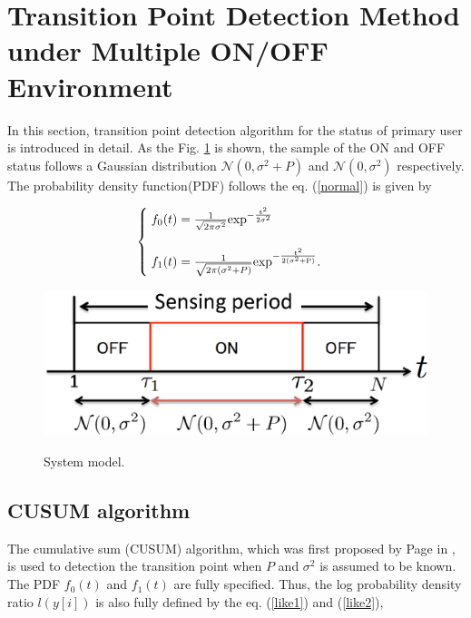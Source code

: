 \section{Transition Point Detection Method under Multiple ON/OFF Environment }    

In this section, transition point detection algorithm for the status of primary user is introduced in detail. As the Fig. \ref{system_model} is shown, the sample of the ON and OFF status follows a Gaussian distribution $\mathcal{N}(0,\sigma^2+P)$ and $\mathcal{N}(0,\sigma^2)$ respectively. The probability density function(PDF) follows the eq. (\ref{normal}) is given by

\begin{eqnarray}
\begin{cases}
\;f_0(t) = \frac{1}{\sqrt{2\pi\sigma^2}} \rm{exp}^{-\frac{t^2}{2\sigma^2}} \\
\; \\ \nonumber
\;f_1(t) = \frac{1}{\sqrt{2\pi(\sigma^2+P)}} \rm{exp}^{-\frac{t^2}{2(\sigma^2+P)}}.
\end{cases}
\label{normal}
\end{eqnarray}

\begin{center}
  \begin{figure}[t]
    \centering
    \includegraphics[width=120mm]{systemodel.eps}
    \label{system_model}
    \caption{\normalsize{System model.}}
  \end{figure}
\end{center} 

\subsection{CUSUM algorithm}
The cumulative sum (CUSUM) algorithm, which was first proposed by Page in \cite{ref:CUSUM}, is used to detection the transition point when $P$ and $\sigma^2$ is assumed to be known.
The PDF $f_0(t)$ and $f_1(t)$ are fully specified. Thus, the log probability density ratio $l(y[i])$ is also fully defined by the eq. (\ref{like1}) and (\ref{like2}),

